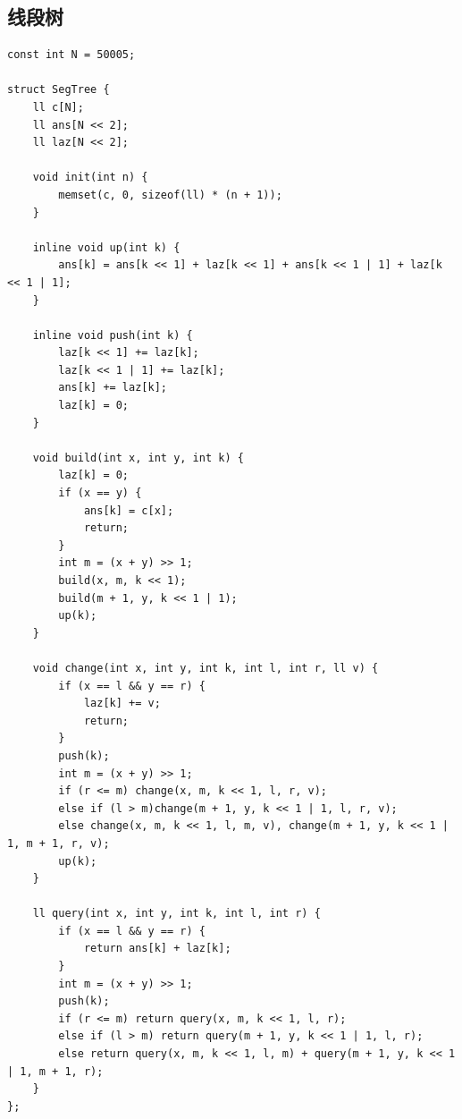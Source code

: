 \documentclass[twoside]{article}
\begin{document}
\subsection{线段树}
\begin{lstlisting}
const int N = 50005;

struct SegTree {
    ll c[N];
    ll ans[N << 2];
    ll laz[N << 2];

    void init(int n) {
        memset(c, 0, sizeof(ll) * (n + 1));
    }

    inline void up(int k) {
        ans[k] = ans[k << 1] + laz[k << 1] + ans[k << 1 | 1] + laz[k << 1 | 1];
    }

    inline void push(int k) {
        laz[k << 1] += laz[k];
        laz[k << 1 | 1] += laz[k];
        ans[k] += laz[k];
        laz[k] = 0;
    }

    void build(int x, int y, int k) {
        laz[k] = 0;
        if (x == y) {
            ans[k] = c[x];
            return;
        }
        int m = (x + y) >> 1;
        build(x, m, k << 1);
        build(m + 1, y, k << 1 | 1);
        up(k);
    }

    void change(int x, int y, int k, int l, int r, ll v) {
        if (x == l && y == r) {
            laz[k] += v;
            return;
        }
        push(k);
        int m = (x + y) >> 1;
        if (r <= m) change(x, m, k << 1, l, r, v);
        else if (l > m)change(m + 1, y, k << 1 | 1, l, r, v);
        else change(x, m, k << 1, l, m, v), change(m + 1, y, k << 1 | 1, m + 1, r, v);
        up(k);
    }

    ll query(int x, int y, int k, int l, int r) {
        if (x == l && y == r) {
            return ans[k] + laz[k];
        }
        int m = (x + y) >> 1;
        push(k);
        if (r <= m) return query(x, m, k << 1, l, r);
        else if (l > m) return query(m + 1, y, k << 1 | 1, l, r);
        else return query(x, m, k << 1, l, m) + query(m + 1, y, k << 1 | 1, m + 1, r);
    }
};\end{lstlisting}
\end{document}
